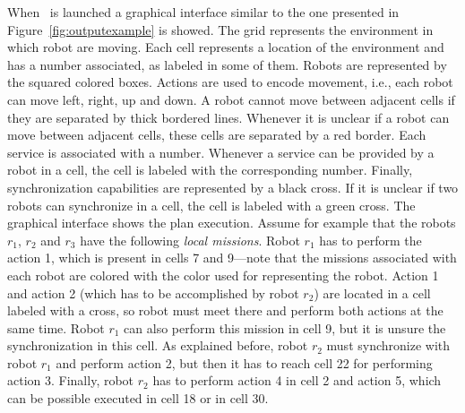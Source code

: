 When  \toolName\ is launched a graphical interface similar to the one presented  in Figure~\ref{fig:outputexample} is showed.
The grid represents the environment in which robot are moving.
Each cell represents a location of the environment and has a number associated, as labeled in some of them.
Robots are represented by the squared colored boxes.
Actions are used to encode movement, i.e., each robot can move left, right, up and down.
A robot  cannot move between adjacent cells if they are separated by thick bordered lines.
Whenever  it is unclear if a robot can move between adjacent cells, these cells are separated by a red border.
Each service is associated with a number.
Whenever a service can be provided by a robot in a cell, the cell is labeled with the corresponding number.
Finally, synchronization capabilities are represented by a black cross.
If it is unclear if two robots can synchronize in a cell, the cell is labeled with a green cross.
The graphical interface shows the plan execution.
Assume for example that the robots $r_1$, $r_2$ and $r_3$ have the following \emph{local missions}.
Robot $r_1$ has to perform the action 1, which is present in cells 7 and 9---note that the missions associated with each robot are colored with the color used for representing the robot.
Action 1 and action 2 (which has to be accomplished by robot $r_2$) are located in a cell labeled with a cross, so robot must meet there and perform both actions at the same time.
Robot $r_1$ can also perform this mission in cell 9, but it is unsure the synchronization in this cell.
As explained before, robot $r_2$ must synchronize with robot $r_1$ and perform action 2, but then it has to reach cell 22 for performing action 3.
Finally, robot $r_2$ has to perform action 4 in cell 2 and action 5, which can be possible executed in cell 18 or in cell 30.





